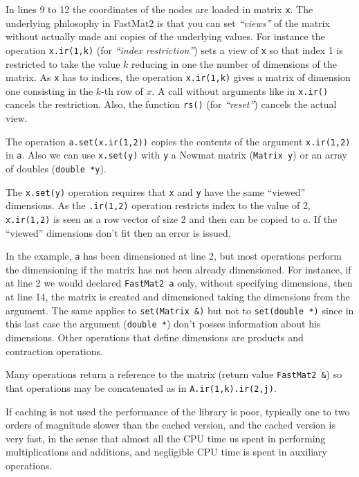 In lines 9 to 12 the coordinates of the nodes are
loaded in matrix \verb+x+. The underlying philosophy in FastMat2 is
that you can set \emph{``views''} of the matrix without actually made
ani copies of the underlying values. For instance the operation
\verb+x.ir(1,k)+ (for \emph{``index restriction''}) sets a view of
\verb+x+ so that index 1 is restricted to take the value $k$ reducing
in one the number of dimensions of the matrix. As \verb+x+ has to
indices, the operation \verb+x.ir(1,k)+ gives a matrix of dimension
one consisting in the $k$-th row of $x$. A call without arguments like
in \verb+x.ir()+ cancels the restriction. Also, the function \verb+rs()+
(for \emph{``reset''}) cancels the actual view. 

The operation \verb+a.set(x.ir(1,2))+ copies the contents of the
argument \verb+x.ir(1,2)+ in \verb+a+. Also we can use \verb+x.set(y)+
with \verb+y+ a Newmat matrix (\verb+Matrix y+) or an array of doubles
(\verb+double *y+). 

 The \verb+x.set(y)+ operation requires
that \verb+x+ and \verb+y+ have the same ``viewed'' dimensions.  As the
\verb+.ir(1,2)+ operation restricts index to the value of 2,
\verb+x.ir(1,2)+ is seen as a row vector of size 2 and then can be
copied to $a$. If the ``viewed'' dimensions don't fit then an error is
issued.

In the example, \verb+a+ has been dimensioned at line
2, but most operations perform the dimensioning if the matrix has not
been already dimensioned. For instance, if at line 2 we would declared
\verb+FastMat2 a+ only, without specifying dimensions, then at line
14, the matrix is created and dimensioned taking the dimensions from
the argument. The same applies to \verb+set(Matrix &)+ but not to
\verb+set(double *)+ since in this last case the argument
(\verb+double *+) don't posses information about his dimensions. Other
operations that define dimensions are products and contraction
operations. 

 Many operations return a
reference to the matrix (return value \verb+FastMat2 &+) so that
operations may be concatenated as in \verb+A.ir(1,k).ir(2,j)+.


If caching is not used the performance of the library is poor,
typically one to two orders of magnitude slower than the cached
version, and the cached version is very fast, in the sense that almost
all the CPU time us spent in performing multiplications and additions,
and negligible CPU time is spent in auxiliary operations. 

